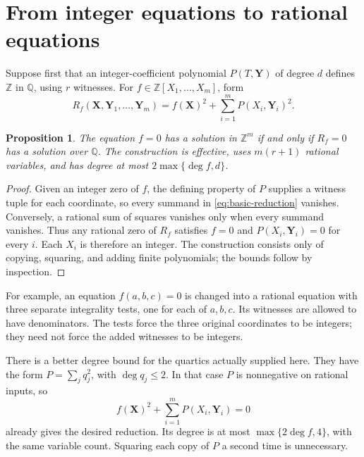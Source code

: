 \documentclass[11pt]{article}
\newtheorem{proposition}[theorem]{Proposition}
\theoremstyle{definition}
\newcommand{\Q}{\mathbb Q}
\newcommand{\Z}{\mathbb Z}
\begin{document}
\section{From integer equations to rational equations}
\label{sec:reduction}

Suppose first that an integer-coefficient polynomial
$P(T,\mathbf Y)$ of degree $d$ defines $\Z$ in $\Q$, using $r$
witnesses. For $f\in\Z[X_1,\ldots,X_m]$, form
\begin{equation}\label{eq:basic-reduction}
 R_f(\mathbf X,\mathbf Y_1,\ldots,\mathbf Y_m)
 =f(\mathbf X)^2+\sum_{i=1}^m P(X_i,\mathbf Y_i)^2.
\end{equation}
\begin{proposition}\label{prop:integer-rational-reduction}
The equation $f=0$ has a solution in $\Z^m$ if and only if
$R_f=0$ has a solution over $\Q$. The construction is effective,
uses $m(r+1)$ rational variables, and has degree at most
$2\max\{\deg f,d\}$.
\end{proposition}
\begin{proof}
Given an integer zero of $f$, the defining property of $P$ supplies
a witness tuple for each coordinate, so every summand in
\eqref{eq:basic-reduction} vanishes. Conversely, a rational sum of
squares vanishes only when every summand vanishes. Thus any rational
zero of $R_f$ satisfies $f=0$ and $P(X_i,\mathbf Y_i)=0$ for every
$i$. Each $X_i$ is therefore an integer. The construction consists
only of copying, squaring, and adding finite polynomials; the bounds
follow by inspection.
\end{proof}

For example, an equation $f(a,b,c)=0$ is changed into a rational
equation with three separate integrality tests, one for each of
$a,b,c$. Its witnesses are allowed to have denominators. The tests
force the three original coordinates to be integers; they need not
force the added witnesses to be integers.

There is a better degree bound for the quartics actually supplied
here. They have the form $P=\sum_j q_j^2$, with $\deg q_j\leq2$.
In that case $P$ is nonnegative on rational inputs, so
\begin{equation}\label{eq:sos-reduction}
 f(\mathbf X)^2+\sum_{i=1}^m P(X_i,\mathbf Y_i)=0
\end{equation}
already gives the desired reduction. Its degree is at most
$\max\{2\deg f,4\}$, with the same variable count. Squaring each
copy of $P$ a second time is unnecessary.
\end{document}

